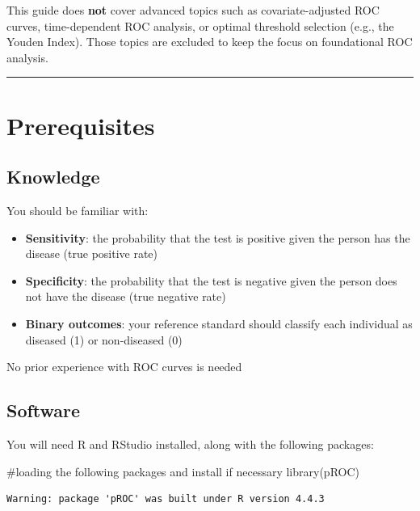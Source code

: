 \documentclass[
  letterpaper,
  DIV=11,
  numbers=noendperiod]{scrreprt}
\newenvironment{Shaded}{\begin{snugshade}}{\end{snugshade}}
\newcommand{\CommentTok}[1]{\textcolor[rgb]{0.37,0.37,0.37}{#1}}
\newcommand{\FunctionTok}[1]{\textcolor[rgb]{0.28,0.35,0.67}{#1}}
\newcommand{\NormalTok}[1]{\textcolor[rgb]{0.00,0.23,0.31}{#1}}
\providecommand{\tightlist}{%
  \setlength{\itemsep}{0pt}\setlength{\parskip}{0pt}}\usepackage{longtable,booktabs,array}
\begin{document}
This guide does \textbf{not} cover advanced topics such as
covariate-adjusted ROC curves, time-dependent ROC analysis, or optimal
threshold selection (e.g., the Youden Index). Those topics are excluded
to keep the focus on foundational ROC analysis.

\begin{center}\rule{0.5\linewidth}{0.5pt}\end{center}

\section{Prerequisites}\label{prerequisites}

\subsection{Knowledge}\label{knowledge}

You should be familiar with:

\begin{itemize}
\tightlist
\item
  \textbf{Sensitivity}: the probability that the test is positive given
  the person has the disease (true positive rate)
\item
  \textbf{Specificity}: the probability that the test is negative given
  the person does not have the disease (true negative rate)
\item
  \textbf{Binary outcomes}: your reference standard should classify each
  individual as diseased (1) or non-diseased (0)
\end{itemize}

No prior experience with ROC curves is needed

\subsection{Software}\label{software}

You will need R and RStudio installed, along with the following
packages:

\begin{Shaded}
\begin{Highlighting}[]
\CommentTok{\#loading the following packages and install if necessary}
\FunctionTok{library}\NormalTok{(pROC)}
\end{Highlighting}
\end{Shaded}

\begin{verbatim}
Warning: package 'pROC' was built under R version 4.4.3
\end{verbatim}
\end{document}
